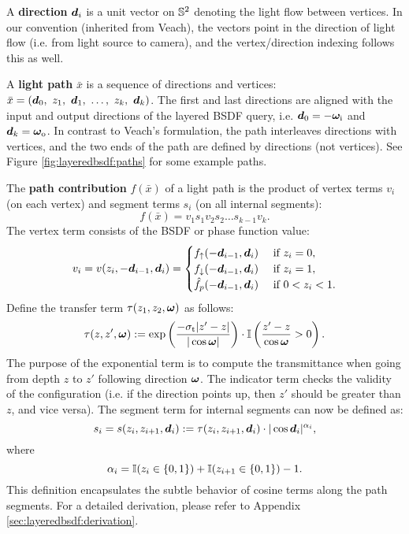 A {\bf direction} $\bm{d}_i$ is a unit vector on $\mathbb{S}^2$ denoting the light flow between vertices. In our convention (inherited from Veach), 
the vectors point in the direction of light flow (i.e. from light source to camera), and the vertex/direction indexing follows this as well.

A {\bf light path} $\bar x$ is a sequence of directions and vertices: $\bar x = (\bmd_0,\ z_1,\ \bmd_1,\ \dots,\ z_k,\ \bmd_k)$.
The first and last directions are aligned with the input and output directions of the layered BSDF query, i.e. $\bm{d}_0 = -\bm\omega_\mathrm{i}$ and $\bm{d}_k = \bm\omega_\mathrm{o}$. In contrast to Veach's formulation, the path interleaves directions with vertices, and the two ends of the path are defined by directions (not vertices). See Figure \ref{fig:layeredbsdf:paths} for some example paths.



The {\bf path contribution} $f(\bar x)$ of a light path is the product of vertex terms $v_i$ (on each vertex) and segment terms $s_i$ (on all internal segments):
\begin{equation}
	f(\bar x) = v_1 s_1 v_2 s_2 \dots s_{k-1} v_k.
\end{equation}
The vertex term consists of the BSDF or phase function value:
\begin{equation}
\label{eqn:vtx_contrib}
v_i = v(z_i, -\bm{d}_{i - 1}, \bm{d}_i)
= \begin{cases}
	f_\uparrow(-\bm{d}_{i-1}, \bm{d}_i)   & \mbox{  if  } z_i = 0,\\
	f_\downarrow(-\bm{d}_{i-1}, \bm{d}_i) & \mbox{  if  } z_i = 1,\\
  	\hat{f}_p(-\bm{d}_{i-1}, \bm{d}_i)    & \mbox{  if  } 0 < z_i < 1.
\end{cases}
\end{equation}
Define the transfer term $\tau(z_1, z_2, \bm\omega)$ as follows:
\begin{equation}
\tau(z, z', \bm\omega) := \exp \left( \frac{-\sigma_\mathrm{t} |z' - z|}{|\cos \bm\omega|} \right) \cdot \mathbb{I} \left( \frac{z' - z}{\cos \bm\omega} > 0 \right).
\end{equation}
The purpose of the exponential term is to compute the transmittance when going from depth $z$ to $z'$ following direction $\bm\omega$.
The indicator term checks the validity of the configuration (i.e. if the direction points up, then $z'$ should be greater than $z$, and vice versa). The segment term for internal segments can now be defined as:
\begin{equation}
\label{eqn:seg_contrib}
s_i = s(z_i, z_{i + 1}, \bm{d}_i) := \tau(z_i, z_{i+1}, \bm{d}_i) \cdot |\cos \bm{d}_i|^{\alpha_i},
\end{equation}
where
\begin{equation}
\label{eqn:seg_contrib_cosine}
\alpha_i = \mathbb{I}(z_i \in \{0,1\}) + \mathbb{I}(z_{i + 1} \in \{0,1\}) - 1.
\end{equation}
This definition encapsulates the subtle behavior of cosine terms along the path segments.
For a detailed derivation, please refer to Appendix \ref{sec:layeredbsdf:derivation}.

